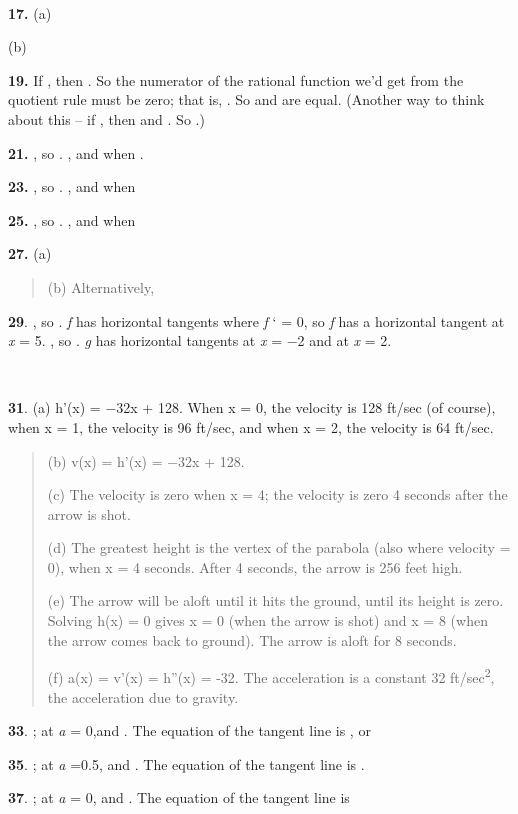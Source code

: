 \textbf{\\
}

\textbf{17.} (a)

(b)

\textbf{19.} If , then . So the numerator of the rational function we'd
get from the quotient rule must be zero; that is, . So and are equal.
(Another way to think about this -- if , then and . So .)

\textbf{21.} , so . , and when .

\textbf{23.} , so . , and when

\textbf{25.} , so . , and when

\textbf{27.} (a)

\begin{quote}
(b) Alternatively,
\end{quote}

\textbf{29}. , so . \emph{f} has horizontal tangents where \emph{f} ` =
0, so \emph{f} has a horizontal tangent at \emph{x} = 5. , so . \emph{g}
has horizontal tangents at \emph{x} = −2 and at \emph{x} = 2.

\textbf{\\
}

\textbf{31}. (a) h'(x) = −32x + 128. When x = 0, the velocity is 128
ft/sec (of course), when x = 1, the velocity is 96 ft/sec, and when x =
2, the velocity is 64 ft/sec.

\begin{quote}
(b) v(x) = h'(x) = −32x + 128.

(c) The velocity is zero when x = 4; the velocity is zero 4 seconds
after the arrow is shot.

(d) The greatest height is the vertex of the parabola (also where
velocity = 0), when x = 4 seconds. After 4 seconds, the arrow is 256
feet high.

(e) The arrow will be aloft until it hits the ground, until its height
is zero. Solving h(x) = 0 gives x = 0 (when the arrow is shot) and x = 8
(when the arrow comes back to ground). The arrow is aloft for 8 seconds.

(f) a(x) = v'(x) = h''(x) = -32. The acceleration is a constant 32
ft/sec\textsuperscript{2}, the acceleration due to gravity.
\end{quote}

\textbf{33}. ; at \emph{a} = 0,and . The equation of the tangent line is
, or

\textbf{35}. ; at \emph{a} =0.5, and . The equation of the tangent line
is .

\textbf{37}. ; at \emph{a} = 0, and . The equation of the tangent line
is

